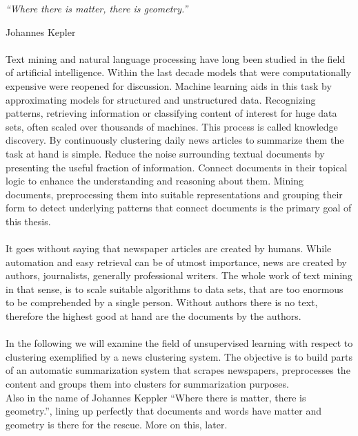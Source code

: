 \epigraph{\emph{
  ``Where there is matter, there is geometry.''
}}{ Johannes Kepler }

\paragraph{} Text mining and natural language processing have long been studied in the field of artificial intelligence. Within the last decade models that were computationally expensive were reopened for discussion. Machine learning aids in this task by approximating models for structured and unstructured data. Recognizing patterns, retrieving information or classifying content of interest for huge data sets, often scaled over thousands of machines. This process is called knowledge discovery. By continuously clustering daily news articles to summarize them the task at hand is simple. Reduce the noise surrounding textual documents by presenting the useful fraction of information. Connect documents in their topical logic to enhance the understanding and reasoning about them. Mining documents, preprocessing them into suitable representations and grouping their form to detect underlying patterns that connect documents is the primary goal of this thesis.

\paragraph{} It goes without saying that newspaper articles are created by humans. While automation and easy retrieval can be of utmost importance, news are created by authors, journalists, generally professional writers. The whole work of text mining in that sense, is to scale suitable algorithms to data sets, that are too enormous to be comprehended by a single person. Without authors there is no text, therefore the highest good at hand are the documents by the authors.

\paragraph{} In the following we will examine the field of unsupervised learning with respect to clustering exemplified by a news clustering system. The objective is to build parts of an automatic summarization system that scrapes newspapers, preprocesses the content and groups them into clusters for summarization purposes.\\
Also in the name of Johannes Keppler ``Where there is matter, there is geometry.'', lining up perfectly that documents and words have matter and geometry is there for the rescue. More on this, later.

